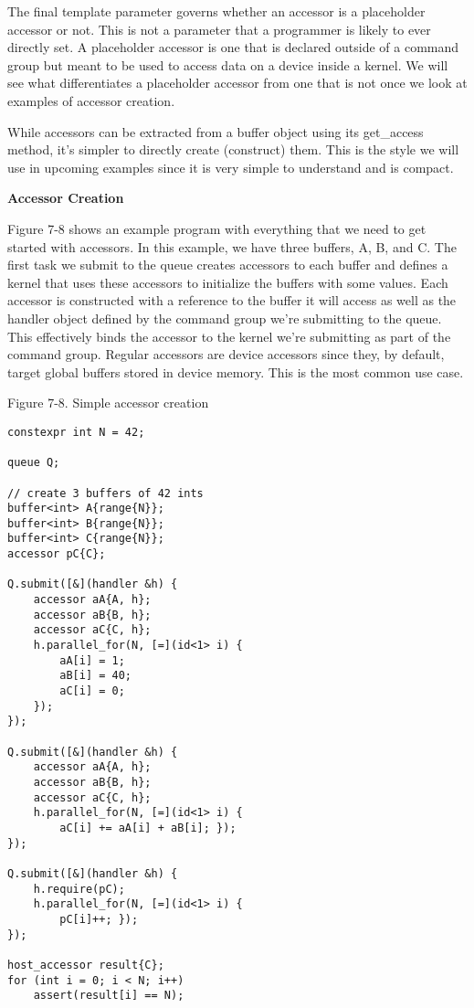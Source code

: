 The final template parameter governs whether an accessor is a placeholder accessor or not. This is not a parameter that a programmer is likely to ever directly set. A placeholder accessor is one that is declared outside of a command group but meant to be used to access data on a device inside a kernel. We will see what differentiates a placeholder accessor from one that is not once we look at examples of accessor creation.\par

While accessors can be extracted from a buffer object using its get\_access method, it’s simpler to directly create (construct) them. This is the style we will use in upcoming examples since it is very simple to understand and is compact.\par

\hspace*{\fill} \par %
\textbf{Accessor Creation}

Figure 7-8 shows an example program with everything that we need to get started with accessors. In this example, we have three buffers, A, B, and C. The first task we submit to the queue creates accessors to each buffer and defines a kernel that uses these accessors to initialize the buffers with some values. Each accessor is constructed with a reference to the buffer it will access as well as the handler object defined by the command group we’re submitting to the queue. This effectively binds the accessor to the kernel we’re submitting as part of the command group. Regular accessors are device accessors since they, by default, target global buffers stored in device memory. This is the most common use case.\par

\hspace*{\fill} \par %
Figure 7-8. Simple accessor creation
\begin{lstlisting}[caption={}]
constexpr int N = 42;

queue Q;

// create 3 buffers of 42 ints
buffer<int> A{range{N}};
buffer<int> B{range{N}};
buffer<int> C{range{N}};
accessor pC{C};

Q.submit([&](handler &h) {
	accessor aA{A, h};
	accessor aB{B, h};
	accessor aC{C, h};
	h.parallel_for(N, [=](id<1> i) {
		aA[i] = 1;
		aB[i] = 40;
		aC[i] = 0;
	});
});

Q.submit([&](handler &h) {
	accessor aA{A, h};
	accessor aB{B, h};
	accessor aC{C, h};
	h.parallel_for(N, [=](id<1> i) {
		aC[i] += aA[i] + aB[i]; });
});

Q.submit([&](handler &h) {
	h.require(pC);
	h.parallel_for(N, [=](id<1> i) {
		pC[i]++; });
});

host_accessor result{C};
for (int i = 0; i < N; i++)
	assert(result[i] == N);
\end{lstlisting}

